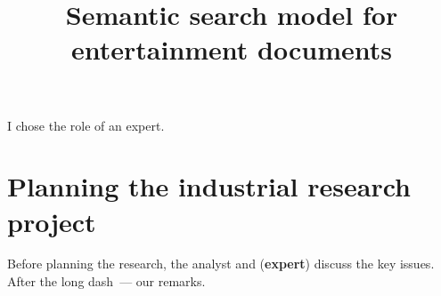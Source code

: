 \documentclass[12pt]{article}
\title{Semantic search model for entertainment documents}
\date{}
\begin{document}
\maketitle

I chose the role of an {expert}.


\section{Planning the industrial research project}
Before planning the research, the analyst and (\textbf{expert}) discuss the key issues. After the long dash~--- our remarks.
\end{document}
